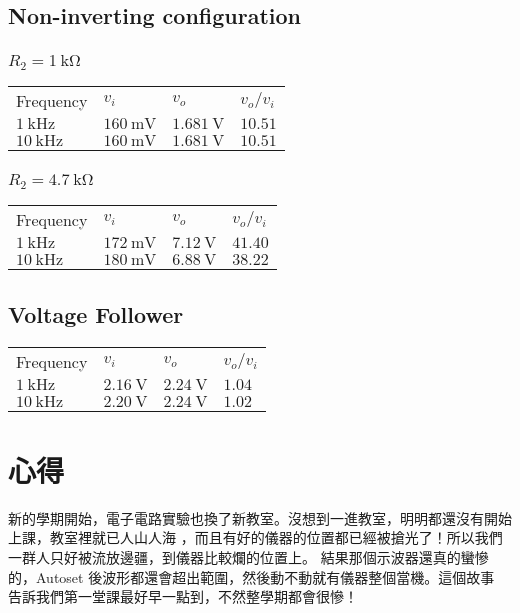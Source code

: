 \documentclass[12pt, a4paper]{article}
\begin{document}
\subsection{Non-inverting configuration}

\subsubsection{ $R_2 = \SI{1}\kohm$ }
\begin{center}
  \begin{tabular}{p{3.5cm}p{2.5cm}p{2.5cm}p{2.5cm}}
    \hline
    Frequency & $v_i$ & $v_o$ & $v_o/v_i$ \\
    \hhline{====}
    $\SI{1}{\kHz}$ & $\SI{160}{\mV}$ & $\SI{1.681}{\V}$ & $10.51$  \\
    $\SI{10}{\kHz}$ & $\SI{160}{\mV}$ & $\SI{1.681}{\V}$ & $10.51$  \\
    \hline
  \end{tabular}
\end{center}

\subsubsection{ $R_2 = \SI{4.7}\kohm$ }
\begin{center}
  \begin{tabular}{p{3.5cm}p{2.5cm}p{2.5cm}p{2.5cm}}
    \hline
    Frequency & $v_i$ & $v_o$ & $v_o/v_i$ \\
    \hhline{====}
    $\SI{1}{\kHz}$ & $\SI{172}{\mV}$ & $\SI{7.12}{\V}$ & $41.40$  \\
    $\SI{10}{\kHz}$ & $\SI{180}{\mV}$ & $\SI{6.88}{\V}$ & $38.22$  \\
    \hline
  \end{tabular}
\end{center}

\subsection{Voltage Follower}

\begin{center}
  \begin{tabular}{p{3.5cm}p{2.5cm}p{2.5cm}p{2.5cm}}
    \hline
    Frequency & $v_i$ & $v_o$ & $v_o/v_i$ \\
    \hhline{====}
    $\SI{1}{\kHz}$ & $\SI{2.16}{\V}$ & $\SI{2.24}{\V}$ & $1.04$  \\
    $\SI{10}{\kHz}$ & $\SI{2.20}{\V}$ & $\SI{2.24}{\V}$ & $1.02$  \\
    \hline
  \end{tabular}
\end{center}


\section{心得}
新的學期開始，電子電路實驗也換了新教室。沒想到一進教室，明明都還沒有開始上課，教室裡就已人山人海
，而且有好的儀器的位置都已經被搶光了！所以我們一群人只好被流放邊疆，到儀器比較爛的位置上。
結果那個示波器還真的蠻慘的，Autoset 後波形都還會超出範圍，然後動不動就有儀器整個當機。這個故事
告訴我們第一堂課最好早一點到，不然整學期都會很慘！
\end{document}
